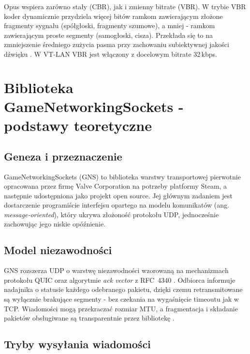 Opus wspiera zarówno stały (CBR), jak i zmienny bitrate (VBR). W trybie VBR
koder dynamicznie przydziela więcej bitów ramkom zawierającym złożone
fragmenty sygnału (spółgłoski, fragmenty szumowe), a mniej - ramkom
zawierającym proste segmenty (samogłoski, cisza). Przekłada się to na
zmniejszenie średniego zużycia pasma przy zachowaniu subiektywnej jakości
dźwięku \cite{OpusRFC}. W VT-LAN VBR jest włączony z docelowym
bitrate 32\,kbps.

\section{Biblioteka GameNetworkingSockets - podstawy teoretyczne}
\label{sec:gns_theory}

\subsection*{Geneza i przeznaczenie}

GameNetworkingSockets (GNS) \cite{GNS} to biblioteka warstwy transportowej
pierwotnie opracowana przez firmę Valve Corporation na potrzeby platformy
Steam, a następnie udostępniona jako projekt open source. Jej głównym
zadaniem jest dostarczenie programiście interfejsu opartego na modelu
komunikatów (ang. \textit{message-oriented}), który ukrywa złożoność
protokołu UDP, jednocześnie zachowując jego niskie opóźnienie.

\subsection*{Model niezawodności}

GNS rozszerza UDP o warstwę niezawodności wzorowaną na mechanizmach
protokołu QUIC oraz algorytmie \textit{ack vector} z RFC~4340 \cite{GNS}.
Odbiorca informuje nadajnika o statusie każdego odebranego pakietu, dzięki
czemu retransmitowane są wyłącznie brakujące segmenty - bez czekania na
wygaśnięcie timeoutu jak w TCP. Wiadomości mogą przekraczać rozmiar MTU,
a fragmentacja i składanie pakietów obsługiwane są transparentnie
przez bibliotekę \cite{GNS}.

\subsection*{Tryby wysyłania wiadomości}

